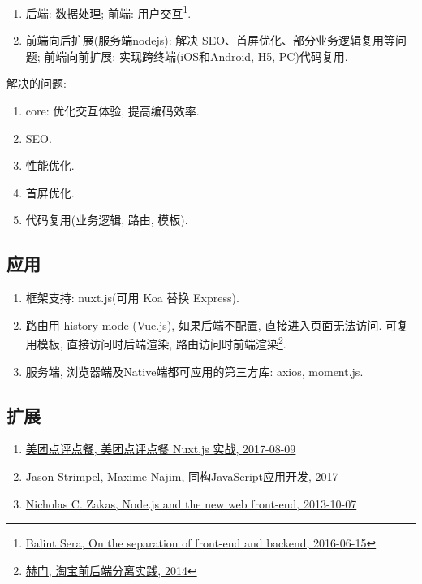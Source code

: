 \begin{enumerate}
\def\labelenumi{\arabic{enumi}.}
\tightlist
\item
  后端: 数据处理; 前端: 用户交互\footnote{\href{https://medium.com/@balint_sera/on-the-separation-of-front-end-and-backend-7a0809b42820}{Balint
    Sera, On the separation of front-end and backend, 2016-06-15}}.
\item
  前端向后扩展(服务端nodejs): 解决
  SEO、首屏优化、部分业务逻辑复用等问题; 前端向前扩展:
  实现跨终端(iOS和Android, H5, PC)代码复用.
\end{enumerate}

解决的问题:

\begin{enumerate}
\def\labelenumi{\arabic{enumi}.}
\setcounter{enumi}{-1}
\tightlist
\item
  core: 优化交互体验, 提高编码效率.
\item
  SEO.
\item
  性能优化.
\item
  首屏优化.
\item
  代码复用(业务逻辑, 路由, 模板).
\end{enumerate}

\subsection{应用}\label{ux5e94ux7528}

\begin{enumerate}
\def\labelenumi{\arabic{enumi}.}
\tightlist
\item
  框架支持: nuxt.js(可用 Koa 替换 Express).
\item
  路由用 history mode (Vue.js), 如果后端不配置, 直接进入页面无法访问.
  可复用模板, 直接访问时后端渲染, 路由访问时前端渲染\footnote{\href{http://2014.jsconf.cn/slides/herman-taobaoweb/\#/}{赫门,
    淘宝前后端分离实践, 2014}}.
\item
  服务端, 浏览器端及Native端都可应用的第三方库: axios, moment.js.
\end{enumerate}

\subsection{扩展}\label{ux6269ux5c55}

\begin{enumerate}
\def\labelenumi{\arabic{enumi}.}
\tightlist
\item
  \href{https://juejin.im/post/598aabe96fb9a03c335a8dde}{美团点评点餐,
  美团点评点餐 Nuxt.js 实战, 2017-08-09}
\item
  \href{https://book.douban.com/subject/27183584/}{Jason Strimpel,
  Maxime Najim, 同构JavaScript应用开发, 2017}
\item
  \href{https://www.nczonline.net/blog/2013/10/07/node-js-and-the-new-web-front-end/}{Nicholas
  C. Zakas, Node.js and the new web front-end, 2013-10-07}
\end{enumerate}

